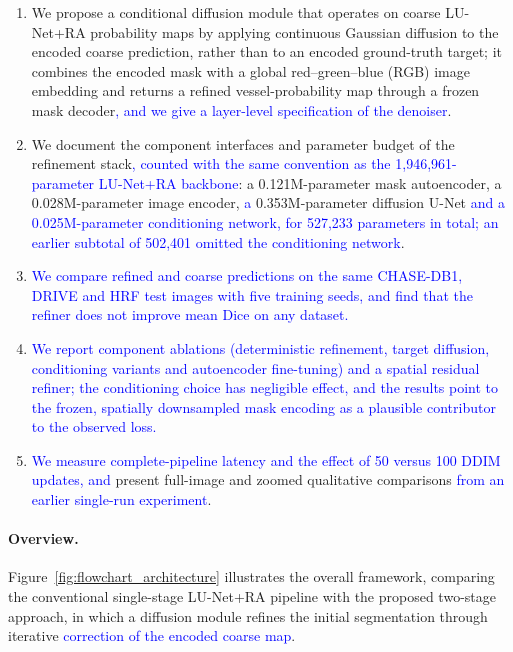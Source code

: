 \documentclass[jimaging,article,submit,pdftex,moreauthors]
  {Definitions/mdpi}
\DeclareRobustCommand{\rev}[1]{\textcolor{blue}{#1}}
\DeclareRobustCommand{\rev}[1]{#1}
\providecommand{\linelabel}[1]{}
\newcommand{\secend}[1]{\linelabel{rev:end:#1}}
\begin{document}
\begin{enumerate}

  \item We propose a conditional diffusion module that operates on
coarse LU-Net+RA probability maps by applying continuous Gaussian diffusion to
the encoded coarse prediction, rather than to an encoded ground-truth target;
it combines the encoded mask with a global red--green--blue (RGB) image
embedding and returns a refined vessel-probability map through a frozen mask
decoder\rev{, and we give a layer-level specification of the denoiser}.

  \item We document the component interfaces and parameter budget of the refinement stack\rev{, counted with the same convention as the 1,946,961-parameter LU-Net+RA backbone}: a 0.121M-parameter mask autoencoder, a 0.028M-parameter image encoder, \rev{a} 0.353M-parameter diffusion U-Net \rev{and a 0.025M-parameter conditioning network, for 527,233 parameters in total; an earlier subtotal of 502,401 omitted the conditioning network}.

  \item \rev{We compare refined and coarse predictions on the same CHASE-DB1, DRIVE and HRF test images with five training seeds, and find that the refiner does not improve mean Dice on any dataset.}

  \item \rev{We report component ablations (deterministic refinement, target diffusion, conditioning variants and autoencoder fine-tuning) and a spatial residual refiner; the conditioning choice has negligible effect, and the results point to the frozen, spatially downsampled mask encoding as a plausible contributor to the observed loss.}

  \item \rev{We measure complete-pipeline latency and the effect of 50 versus 100 DDIM updates, and} present full-image and zoomed qualitative comparisons \rev{from an earlier single-run experiment}.
\end{enumerate}
\secend{contributions}

\paragraph{Overview.}
Figure~\ref{fig:flowchart_architecture} illustrates the overall framework, comparing the conventional single-stage LU-Net+RA pipeline with the proposed two-stage approach, in which a diffusion module refines the initial segmentation through iterative \rev{correction of the encoded coarse map}.
\end{document}
